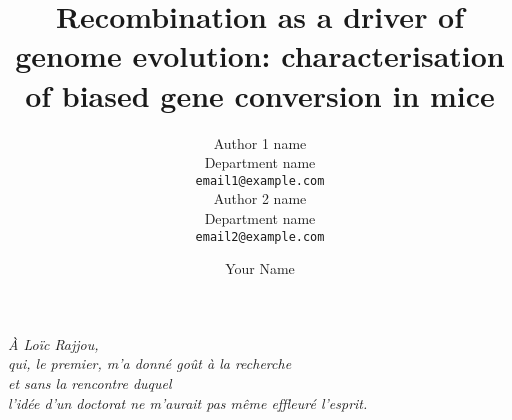 \documentclass[a4paper,twoside]{ociamthesis}
\author{%
    Author 1 name \\
    Department name \\
    \texttt{email1@example.com}\vspace{20pt} \\
    Author 2 name \\
    Department name \\
    \texttt{email2@example.com}
    }
\title{Recombination as a driver of genome evolution: characterisation of biased gene conversion in mice}
\author{Your Name}
\makeatletter
\newcommand{\savefont}{\xdef\oldfontsize{\f@size}\xdef\oldblskip{\f@baselineskip}}
\newcommand{\backtoppevfont}{\fontsize{\oldfontsize}{\oldblskip}\selectfont}
\def\printauthor{%
    {\large \@author}}
\newcommand\titlepagedecoration{%
\begin{tikzpicture}[remember picture,overlay,shorten >= -10pt]

\coordinate (aux1) at ([yshift=-15pt]current page.north east);
\coordinate (aux2) at ([yshift=-410pt]current page.north east);
\coordinate (aux3) at ([xshift=-4.5cm]current page.north east);
\coordinate (aux4) at ([yshift=-150pt]current page.north east);

\begin{scope}[titlepagecolor!40,line width=12pt,rounded corners=12pt]
\draw
  (aux1) -- coordinate (a)
  ++(225:5) --
  ++(-45:5.1) coordinate (b);
\draw[shorten <= -10pt]
  (aux3) --
  (a) --
  (aux1);
\draw[opacity=0.6,titlepagecolor,shorten <= -10pt]
  (b) --
  ++(225:2.2) --
  ++(-45:2.2);
\end{scope}
\draw[titlepagecolor,line width=8pt,rounded corners=8pt,shorten <= -10pt]
  (aux4) --
  ++(225:0.8) --
  ++(-45:0.8);
\begin{scope}[titlepagecolor!70,line width=6pt,rounded corners=8pt]
\draw[shorten <= -10pt]
  (aux2) --
  ++(225:3) coordinate[pos=0.45] (c) --
  ++(-45:3.1);
\draw
  (aux2) --
  (c) --
  ++(135:2.5) --
  ++(45:2.5) --
  ++(-45:2.5) coordinate[pos=0.3] (d);   
\draw 
  (d) -- +(45:1);
\end{scope}
\end{tikzpicture}%
}
\makeatother
\begin{document}



%
%
%

\setlength{\textbaselineskip}{22pt plus2pt}

\setlength{\frontmatterbaselineskip}{17pt plus1pt minus1pt}

\setlength{\baselineskip}{\textbaselineskip}



\setcounter{secnumdepth}{2}
\setcounter{tocdepth}{2}


\begin{dedication}
	\slshape{\`A Loïc Rajjou,}\\
	\slshape{qui, le premier, m'a donné goût à la recherche}\\
	\slshape{et sans la rencontre duquel}\\
	\slshape{l'idée d'un doctorat ne m'aurait pas même effleuré l'esprit.}
\end{dedication}
\end{document}

